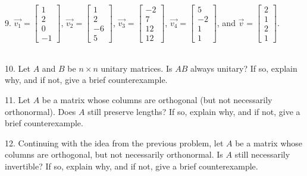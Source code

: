 \documentclass{article}
\begin{document}
9. $\vec{v_1} = \left[\begin{array}{c} 1 \\ 2 \\ 0 \\ -1 \end{array}\right]$, $\vec{v_2} = \left[\begin{array}{c} 1 \\ 2 \\ -6 \\ 5 \end{array}\right]$, $\vec{v_3} = \left[\begin{array}{c} -2 \\ 7 \\ 12 \\ 12 \end{array}\right]$, $\vec{v_4} = \left[\begin{array}{c} 5 \\ -2 \\ 1 \\ 1 \end{array}\right]$, and $\vec{v} = \left[\begin{array}{c} 2 \\ 1 \\ 2 \\ 1 \end{array}\right]$.

~\\

10. Let $A$ and $B$ be $n \times n$ unitary matrices. Is $AB$ always unitary? If so, explain why, and if not, give a brief counterexample.

11. Let $A$ be a matrix whose columns are orthogonal (but not necessarily orthonormal). Does $A$ still preserve lengths? If so, explain why, and if not, give a brief counterexample.

12. Continuing with the idea from the previous problem, let $A$ be a matrix whose columns are orthogonal, but not necessarily orthonormal. Is $A$ still necessarily invertible? If so, explain why, and if not, give a brief counterexample.
\end{document}
